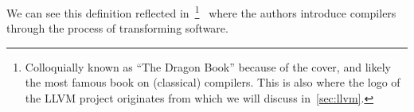 We can see this definition reflected in~\footnote{Colloquially known as ``The Dragon Book'' because of the cover, and likely the most famous book on (classical) compilers. This is also where the logo of the LLVM project originates from which we will discuss in~\cref{sec:llvm}.}~\cite{dragonbook} where the authors introduce compilers through the process of transforming software.
